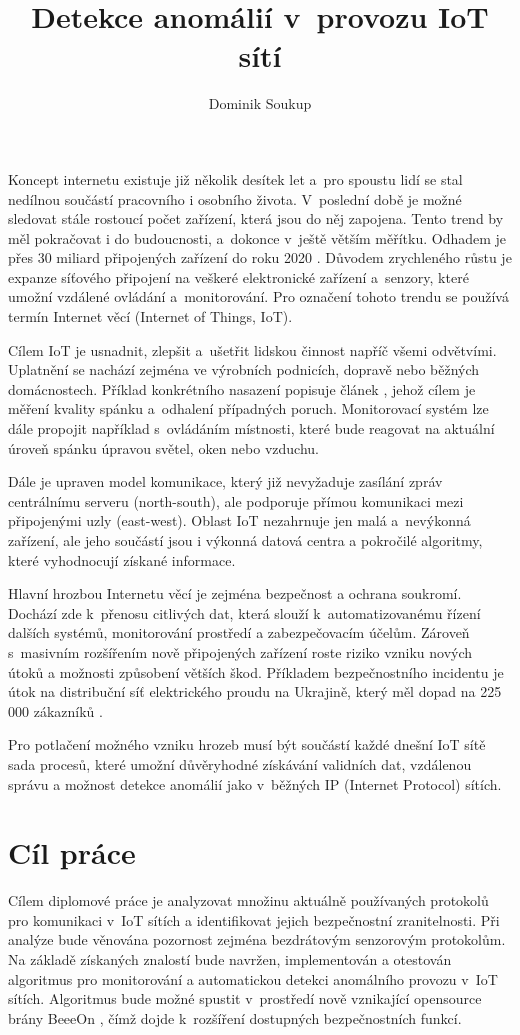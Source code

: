 \documentclass[thesis=M,czech]{FITthesis}[2012/06/26]
\title{Detekce anomálií v~provozu IoT sítí}
\author{Dominik Soukup}
\begin{document}
\begin{introduction}
Koncept internetu existuje již několik desítek let a~pro spoustu lidí se stal 
nedílnou součástí pracovního i osobního života. V~poslední době je možné sledovat
stále rostoucí počet zařízení, která jsou do něj zapojena. Tento trend by měl
pokračovat i do budoucnosti, a~dokonce v~ještě větším měřítku. Odhadem je 
přes 30 miliard připojených zařízení do roku 2020 \cite{iotDevices}.
Důvodem zrychleného
růstu je expanze síťového připojení na veškeré elektronické zařízení a~senzory, 
které umožní vzdálené ovládání a~monitorování. Pro označení tohoto trendu se používá
termín Internet věcí (Internet of Things, IoT).

Cílem IoT je usnadnit, zlepšit a~ušetřit lidskou činnost napříč všemi odvětvími. 
Uplatnění se nachází zejména ve výrobních podnicích, dopravě nebo běžných domácnostech.
Příklad konkrétního nasazení popisuje článek \cite{sleeping}, jehož cílem je měření 
kvality spánku a~odhalení případných poruch. Monitorovací systém lze dále 
propojit například s~ovládáním místnosti, které bude reagovat na aktuální úroveň spánku
úpravou světel, oken nebo vzduchu.

Dále je upraven model komunikace, který již nevyžaduje zasílání zpráv centrálnímu 
serveru (north-south), ale podporuje přímou komunikaci mezi připojenými uzly (east-west).
Oblast IoT nezahrnuje jen malá a~nevýkonná zařízení, ale jeho součástí jsou i 
výkonná datová centra a pokročilé algoritmy, které vyhodnocují získané informace.

Hlavní hrozbou Internetu věcí je zejména bezpečnost a ochrana soukromí. Dochází zde k~přenosu
citlivých dat, která slouží
k~automatizovanému řízení dalších
systémů, monitorování prostředí a zabezpečovacím účelům. Zároveň s~masivním rozšířením nově
připojených zařízení roste riziko vzniku nových útoků a možnosti způsobení větších
škod. Příkladem bezpečnostního incidentu je útok na distribuční síť elektrického 
proudu na Ukrajině, který měl dopad na 225 000 zákazníků \cite{ukraine}. 

Pro potlačení možného vzniku hrozeb musí být součástí každé dnešní IoT sítě sada procesů,
které umožní důvěryhodné
získávání validních dat, vzdálenou správu a možnost
detekce anomálií jako v~běžných IP (Internet Protocol) sítích. 	
\end{introduction}

\chapter{Cíl práce}
Cílem diplomové práce je analyzovat množinu aktuálně používaných protokolů
pro komunikaci v~IoT sítích a identifikovat jejich bezpečnostní zranitelnosti.
Při analýze bude věnována pozornost zejména bezdrátovým senzorovým protokolům.
Na základě získaných znalostí bude navržen, implementován a otestován algoritmus
pro monitorování a automatickou detekci anomálního provozu v~IoT sítích.
Algoritmus bude možné spustit
v~prostředí nově vznikající opensource brány BeeeOn \cite{beeeon}, čímž dojde k~rozšíření 
dostupných bezpečnostních funkcí.
\end{document}
